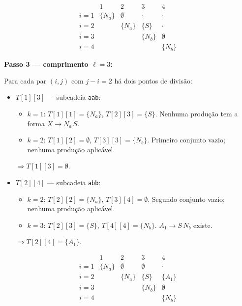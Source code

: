 \[
\begin{array}{c|cccc}
         & 1        & 2        & 3        & 4 \\
\hline
i{=}1 & \{N_a\}  & \emptyset & \cdot    & \cdot \\[2pt]
i{=}2 &          & \{N_a\}   & \{S\}    & \cdot \\[2pt]
i{=}3 &          &           & \{N_b\}  & \emptyset \\[2pt]
i{=}4 &          &           &          & \{N_b\}
\end{array}
\]

\bigskip
\noindent\textbf{Passo 3 — comprimento $\ell = 3$:}

Para cada par $(i,j)$ com $j - i = 2$ há dois pontos de divisão:

\begin{itemize}
  \item $T[1][3]$ — subcadeia \texttt{aab}:
    \begin{itemize}
      \item $k{=}1$: $T[1][1] = \{N_a\}$,\; $T[2][3] = \{S\}$.
            Nenhuma produção tem a forma $X \to N_a\,S$.
      \item $k{=}2$: $T[1][2] = \emptyset$,\; $T[3][3] = \{N_b\}$.
            Primeiro conjunto vazio; nenhuma produção aplicável.
    \end{itemize}
    $\Rightarrow T[1][3] = \emptyset$.

  \item $T[2][4]$ — subcadeia \texttt{abb}:
    \begin{itemize}
      \item $k{=}2$: $T[2][2] = \{N_a\}$,\; $T[3][4] = \emptyset$.
            Segundo conjunto vazio; nenhuma produção aplicável.
      \item $k{=}3$: $T[2][3] = \{S\}$,\; $T[4][4] = \{N_b\}$.
            $A_1 \to S\,N_b$ existe.
    \end{itemize}
    $\Rightarrow T[2][4] = \{A_1\}$.
\end{itemize}

\[
\begin{array}{c|cccc}
         & 1        & 2        & 3        & 4 \\
\hline
i{=}1 & \{N_a\}  & \emptyset & \emptyset & \cdot \\[2pt]
i{=}2 &          & \{N_a\}   & \{S\}     & \{A_1\} \\[2pt]
i{=}3 &          &           & \{N_b\}   & \emptyset \\[2pt]
i{=}4 &          &           &           & \{N_b\}
\end{array}
\]

